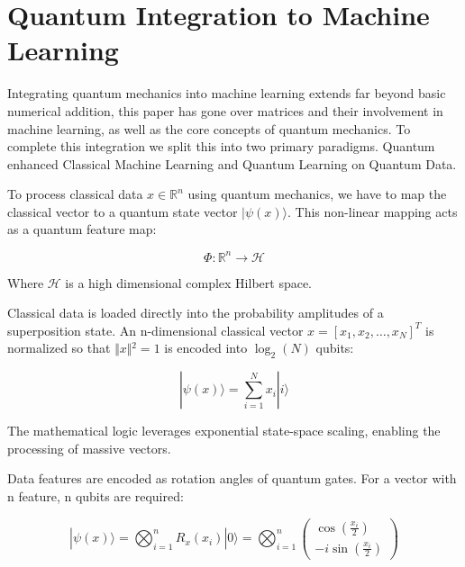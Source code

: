 \documentclass[12pt]{article}
\begin{document}
\section{Quantum Integration to Machine Learning}

Integrating quantum mechanics into machine learning extends far beyond basic numerical addition, this paper has gone over matrices and their involvement in machine learning, as well as the core concepts of quantum mechanics. To complete this integration we split this into two primary paradigms. Quantum enhanced Classical Machine Learning and Quantum Learning on Quantum Data.

To process classical data $x \in \mathbb{R}^n$ using quantum mechanics, we have to map the classical vector to a quantum state vector $\vert\psi(x)\rangle$. This non-linear mapping acts as a quantum feature map:

\begin{equation}
    \Phi :\mathbb{R}^{n}\rightarrow \mathcal{H} \tag{29}
\end{equation}
\vspace{0.1cm}

Where $\mathcal{H}$ is a high dimensional complex Hilbert space.

Classical data is loaded directly into the probability amplitudes of a superposition state. An n-dimensional classical vector $x = [x_1, x_2, \dots, x_N]^T$ is normalized so that $\Vert{}x\Vert{}^2 = 1$ is encoded into $\log_2(N)$ qubits:

\begin{equation}
|\psi (x)\rangle =\sum _{i=1}^{N}x_{i}|i\rangle \tag{30}
\end{equation}
\vspace{0.1cm}

The mathematical logic leverages exponential state-space scaling, enabling the processing of massive
\vspace{0.5cm}
vectors.

Data features are encoded as rotation angles of quantum gates. For a vector with n feature, n qubits are required: 

\begin{equation}
|\psi (x)\rangle =\bigotimes _{i=1}^{n}R_{x}(x_{i})|0\rangle =\bigotimes _{i=1}^{n}\begin{pmatrix}\cos \left(\frac{x_{i}}{2}\right)\\ -i\sin \left(\frac{x_{i}}{2}\right)\end{pmatrix} \tag{31}
\end{equation}
\vspace{0.1cm}
\end{document}
